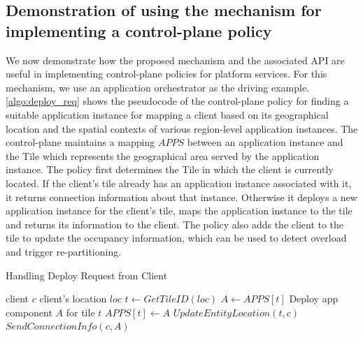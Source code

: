 \subsection{Demonstration of using the mechanism for implementing a control-plane policy}
We now demonstrate how the proposed mechanism and the associated API are useful in implementing control-plane policies for platform services. For this mechanism, we use an application orchestrator as the driving example. \cref{algo:deploy_req} shows the pseudocode of the control-plane policy for finding a suitable application instance for mapping a client based on its geographical location and the spatial contexts of various region-level application instances. The control-plane maintains a mapping $APPS$ between an application instance and the Tile which represents the geographical area served by the application instance. The policy first determines the Tile in which the client is currently located. If the client's tile already has an application instance associated with it, it returns connection information about that instance. Otherwise it deploys a new application instance for the client's tile, maps the application instance to the tile and returns its information to the client. The policy also adds the client to the tile to update the occupancy information, which can be used to detect overload and trigger re-partitioning.
\begin{algorithm}
\caption{Handling Deploy Request from Client}
\begin{algorithmic}
\Require client $c$
\Require client's location $loc$
\State $t \gets GetTileID \left( loc \right)$
    \State $A \gets APPS \left[ t \right]$
\Else
    \State Deploy app component $A$ for tile $t$
    \State $APPS  \left[ t \right] \gets A$
\EndIf
\State $UpdateEntityLocation \left(t, c \right)$
\State $SendConnectionInfo \left(c, A \right)$ 
\end{algorithmic}
\label{algo:deploy_req}
\end{algorithm}

